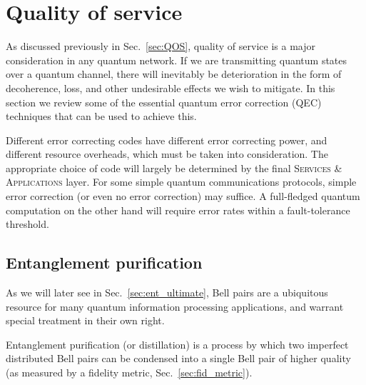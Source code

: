 %
%

\section{Quality of service}\label{sec:QOS_chap}

As discussed previously in Sec.~\ref{sec:QOS}, quality of service is a major consideration in any quantum network. If we are transmitting quantum states over a quantum channel, there will inevitably be deterioration in the form of decoherence, loss, and other undesirable effects we wish to mitigate. In this section we review some of the essential quantum error correction (QEC) techniques that can be used to achieve this.

Different error correcting codes have different error correcting power, and different resource overheads, which must be taken into consideration. The appropriate choice of code will largely be determined by the final \textsc{Services \& Applications} layer. For some simple quantum communications protocols, simple error correction (or even no error correction) may suffice. A full-fledged quantum computation on the other hand will require error rates within a fault-tolerance threshold.

%
%

\subsection{Entanglement purification}

As we will later see in Sec.~\ref{sec:ent_ultimate}, Bell pairs are a ubiquitous resource for many quantum information processing applications, and warrant special treatment in their own right.

Entanglement purification (or distillation) is a process by which two imperfect distributed Bell pairs can be condensed into a single Bell pair of higher quality (as measured by a fidelity metric, Sec.~\ref{sec:fid_metric}).

